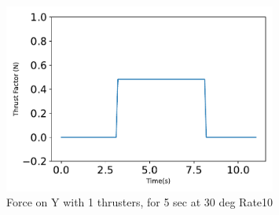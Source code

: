 \begin{figure}[htbp]\centerline{\includegraphics[width=0.8\textwidth]{AutoTeX/Force_1Thrusters_5s_30deg_Loc0_Rate10}}\caption{Force on Y with 1 thrusters, for 5 sec at 30 deg Rate10}\label{fig:Force_1Thrusters_5s_30deg_Loc0_Rate10}\end{figure}